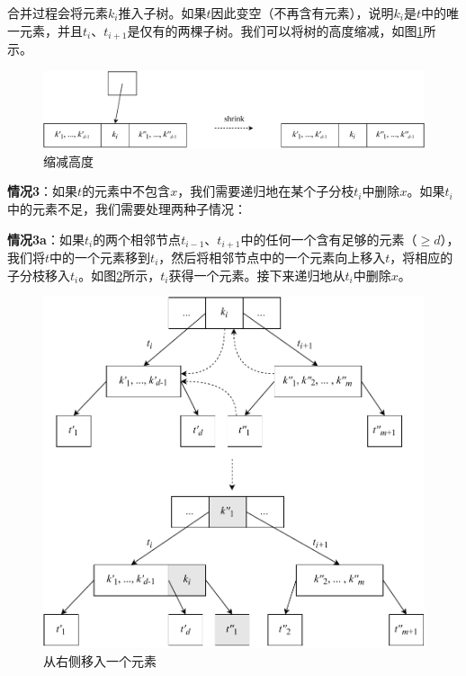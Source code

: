 \documentclass[b5paper]{ctexart}
\begin{document}
合并过程会将元素$k_i$推入子树。如果$t$因此变空（不再含有元素），说明$k_i$是$t$中的唯一元素，并且$t_i$、$t_{i+1}$是仅有的两棵子树。我们可以将树的高度缩减，如图\cref{fig:btree-del-shrink}所示。

\begin{figure}[htbp]
  \centering
  \includegraphics[scale=0.65]{img/btree-del-shrink}
  \caption{缩减高度}
  \label{fig:btree-del-shrink}
\end{figure}

\textbf{情况3}：如果$t$的元素中不包含$x$，我们需要递归地在某个子分枝$t_i$中删除$x$。如果$t_i$中的元素不足，我们需要处理两种子情况：

\textbf{情况3a}：如果$t_i$的两个相邻节点$t_{i-1}$、$t_{i+1}$中的任何一个含有足够的元素（$\geq d$），我们将$t$中的一个元素移到$t_i$，然后将相邻节点中的一个元素向上移入$t$，将相应的子分枝移入$t_i$。如图\cref{fig:btree-del-borrow}所示，$t_i$获得一个元素。接下来递归地从$t_i$中删除$x$。

\begin{figure}[htbp]
  \centering
  \includegraphics[scale=0.65]{img/btree-del-borrow}
  \caption{从右侧移入一个元素}
  \label{fig:btree-del-borrow}
\end{figure}
\end{document}
